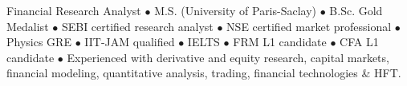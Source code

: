 %
%
%
\par{
Financial Research Analyst $\bullet$ M.S. (University of Paris-Saclay) $\bullet$ B.Sc. Gold Medalist $\bullet$ SEBI certified research analyst $\bullet$ NSE certified market professional $\bullet$ Physics GRE $\bullet$ IIT-JAM qualified $\bullet$ IELTS $\bullet$ FRM L1 candidate $\bullet$ CFA L1 candidate $\bullet$ Experienced with derivative and equity research, capital markets, financial modeling, quantitative analysis, trading, financial technologies \& HFT.
}